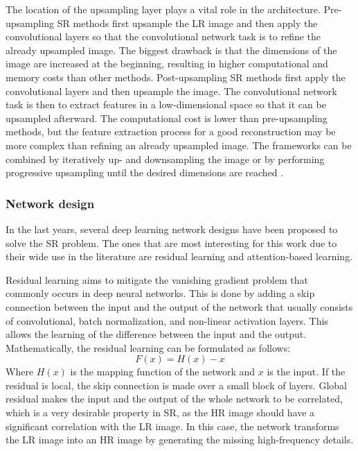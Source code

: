         The location of the upsampling layer plays a vital role in the architecture. Pre-upsampling SR methods first upsample the LR image and then apply the convolutional layers so that the convolutional network task is to refine the already upsampled image. The biggest drawback is that the dimensions of the image are increased at the beginning, resulting in higher computational and memory costs than other methods.
        Post-upsampling SR methods first apply the convolutional layers and then upsample the image. The convolutional network task is then to extract features in a low-dimensional space so that it can be upsampled afterward. The computational cost is lower than pre-upsampling methods, but the feature extraction process for a good reconstruction may be more complex than refining an already upsampled image. 
        The frameworks can be combined by iteratively up- and downsampling the image \cite{timofte2015seven} or by performing progressive upsampling until the desired dimensions are reached \cite{lai2017deep}.

        \subsubsection{Network design}

        In the last years, several deep learning network designs have been proposed to solve the SR problem. The ones that are most interesting for this work due to their wide use in the literature are residual learning and attention-based learning. 
        
        Residual learning aims to mitigate the vanishing gradient problem that commonly occurs in deep neural networks. This is done by adding a skip connection between the input and the output of the network that usually consists of convolutional, batch normalization, and non-linear activation layers. This allows the learning of the difference between the input and the output. Mathematically, the residual learning can be formulated as follows:
        \begin{equation}
            F(x) = H(x) - x
            \label{eq:2-residual-learning}
        \end{equation}
        Where $H(x)$ is the mapping function of the network and $x$ is the input. If the residual is local, the skip connection is made over a small block of layers. Global residual makes the input and the output of the whole network to be correlated, which is a very desirable property in SR, as the HR image should have a significant correlation with the LR image. In this case, the network transforms the LR image into an HR image by generating the missing high-frequency details. 
        
